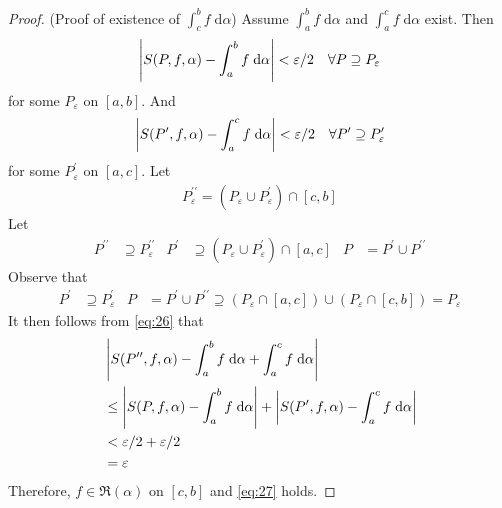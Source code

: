 \documentclass[thmcnt=section, 12pt]{my-elegantbook}
\begin{document}
\begin{proof}
    \par (Proof of existence of $\int_c^b f \; \mathrm{d}\alpha$) Assume $\int_a^b f \; \mathrm{d}\alpha$ and $\int_a^c f \; \mathrm{d}\alpha$ exist. Then
    \begin{align*}
        \left\lvert S(P, f, \alpha) - \int_a^b f \; \mathrm{d}\alpha \right\rvert < \varepsilon / 2
        \quad \forall P \supseteq P_\varepsilon
    \end{align*}
    for some $P_\varepsilon$ on $[a, b]$. And
    \begin{align*}
        \left\lvert S(P^\prime, f, \alpha) - \int_a^c f \; \mathrm{d}\alpha \right\rvert < \varepsilon / 2
        \quad \forall P^\prime \supseteq P_\varepsilon^\prime
    \end{align*}
    for some $P_\varepsilon^\prime$ on $[a, c]$.
    Let
    \begin{align*}
        P_\varepsilon^{\prime\prime} = (P_\varepsilon \cup P_\varepsilon^\prime) \cap [c, b]
    \end{align*}
    Let
    \begin{align*}
        P^{\prime\prime} & \supseteq P_\varepsilon^{\prime\prime}                          &
        P^\prime         & \supseteq (P_\varepsilon \cup P_\varepsilon^\prime) \cap [a, c] &
        P                & = P^\prime \cup P^{\prime\prime}
    \end{align*}
    Observe that
    \begin{align*}
        P^\prime & \supseteq P_\varepsilon^\prime   &
        P        & = P^\prime \cup P^{\prime\prime}
        \supseteq (P_\varepsilon \cap [a, c]) \cup (P_\varepsilon \cap [c, b])
        = P_\varepsilon
    \end{align*}
    It then follows from \eqref{eq:26} that
    \begin{align*}
         & \left\lvert 
            S(P^{\prime\prime}, f, \alpha)
            - \int_a^b f \; \mathrm{d}\alpha
            + \int_a^c f \; \mathrm{d}\alpha
         \right\rvert                                      \\
         & \leq \left\lvert 
            S(P, f, \alpha)
            - \int_a^b f \; \mathrm{d}\alpha
         \right\rvert + \left\lvert 
            S(P^\prime, f, \alpha)
            - \int_a^c f \; \mathrm{d}\alpha
         \right\rvert                                      \\
         & < \varepsilon / 2 + \varepsilon / 2 \\
         & = \varepsilon
    \end{align*}
    Therefore, $f \in \mathfrak{R}(\alpha)$ on $[c, b]$ and \eqref{eq:27} holds.




\end{proof}
\end{document}
